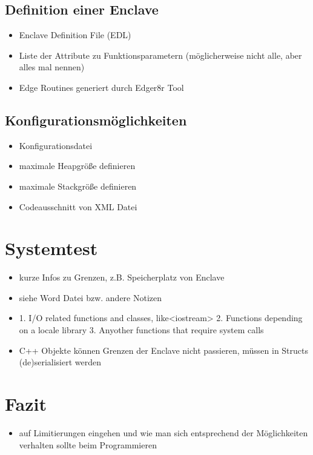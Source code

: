 \subsection{Definition einer Enclave}
\begin{itemize}
	\item Enclave Definition File (EDL)
	\item Liste der Attribute zu Funktionsparametern (möglicherweise nicht alle, aber alles mal nennen)
	\item Edge Routines generiert durch Edger8r Tool
\end{itemize}

\subsection{Konfigurationsmöglichkeiten}
\begin{itemize}
	\item Konfigurationsdatei
	\item maximale Heapgröße definieren
	\item maximale Stackgröße definieren
	\item Codeausschnitt von XML Datei
\end{itemize}

\section{Systemtest}
\begin{itemize}
	\item kurze Infos zu Grenzen, z.B. Speicherplatz von Enclave
\end{itemize}
\begin{itemize}
	\item siehe Word Datei bzw. andere Notizen
	\item \cite{WinDev}
	1. I/O related functions and classes, like<iostream> 
	2. Functions depending on a locale library
	3. Anyother functions that require system calls
	\item C++ Objekte können Grenzen der Enclave nicht passieren, müssen in Structs (de)serialisiert werden
\end{itemize}

\section{Fazit}
\begin{itemize}
	\item auf Limitierungen eingehen und wie man sich entsprechend der Möglichkeiten verhalten sollte beim Programmieren
\end{itemize}